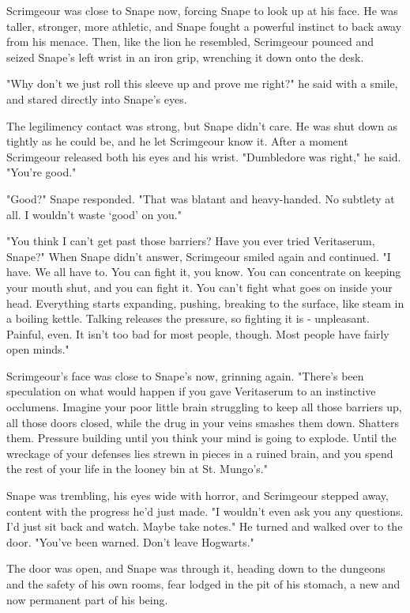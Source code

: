 Scrimgeour was close to Snape now, forcing Snape to look up at his face. He was taller, stronger, more athletic, and Snape fought a powerful instinct to back away from his menace. Then, like the lion he resembled, Scrimgeour pounced and seized Snape's left wrist in an iron grip, wrenching it down onto the desk.

"Why don't we just roll this sleeve up and prove me right?" he said with a smile, and stared directly into Snape's eyes.

The legilimency contact was strong, but Snape didn't care. He was shut down as tightly as he could be, and he let Scrimgeour know it. After a moment Scrimgeour released both his eyes and his wrist. "Dumbledore was right," he said. "You're good."

"Good?" Snape responded. "That was blatant and heavy-handed. No subtlety at all. I wouldn't waste `good' on you."

"You think I can't get past those barriers? Have you ever tried Veritaserum, Snape?" When Snape didn't answer, Scrimgeour smiled again and continued. "I have. We all have to. You can fight it, you know. You can concentrate on keeping your mouth shut, and you can fight it. You can't fight what goes on inside your head. Everything starts expanding, pushing, breaking to the surface, like steam in a boiling kettle. Talking releases the pressure, so fighting it is - unpleasant. Painful, even. It isn't too bad for most people, though. Most people have fairly open minds."

Scrimgeour's face was close to Snape's now, grinning again. "There's been speculation on what would happen if you gave Veritaserum to an instinctive occlumens. Imagine your poor little brain struggling to keep all those barriers up, all those doors closed, while the drug in your veins smashes them down. Shatters them. Pressure building until you think your mind is going to explode. Until the wreckage of your defenses lies strewn in pieces in a ruined brain, and you spend the rest of your life in the looney bin at St. Mungo's."

Snape was trembling, his eyes wide with horror, and Scrimgeour stepped away, content with the progress he'd just made. "I wouldn't even ask you any questions. I'd just sit back and watch. Maybe take notes." He turned and walked over to the door. "You've been warned. Don't leave Hogwarts."

The door was open, and Snape was through it, heading down to the dungeons and the safety of his own rooms, fear lodged in the pit of his stomach, a new and now permanent part of his being.


